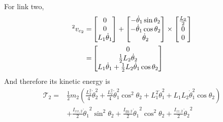 \documentclass{article}
\begin{document}
For link two,
\[
    \begin{aligned}
        \prescript{2}{}{v_{c_2}} = &
        \begin{bmatrix}
            0 \\ 0 \\ L_1 \dot \theta_1
        \end{bmatrix} +
        \begin{bmatrix}
            -\dot \theta_1 \sin\theta_2 \\
            -\dot \theta_1 \cos\theta_2 \\
            \dot \theta_2
        \end{bmatrix} \times \begin{bmatrix}
            \frac{L_2}{2} \\ 0 \\ 0
        \end{bmatrix} \\
        = & \begin{bmatrix}
            0 \\
            \frac{1}{2} L_2 \dot \theta_2 \\
            L_1 \dot \theta_1 + \frac{1}{2} L_2 \dot \theta_1 \cos \theta_2
        \end{bmatrix}
    \end{aligned}
\]
And therefore its kinetic energy is
\[
    \begin{aligned}
        \mathcal T_2 = & \frac{1}{2} m_2 (\frac{L_2^2}{4} \dot \theta_2^2 + \frac{L_2^2}{4}\dot\theta_1^2 \cos^2 \theta_2 + L_1^2 \dot\theta_1^2 + L_1 L_2 \dot\theta_1^2 \cos\theta_2) \\
        & + \frac{I_{xx,2}}{2} {\dot\theta_1}^2 \sin^2\theta_2+ \frac{I_{yy,2}}{2} {\dot\theta_1}^2 \cos^2\theta_2 + \frac{I_{zz,2}}{2} {\dot\theta_2}^2\\
    \end{aligned}
\]
\end{document}
